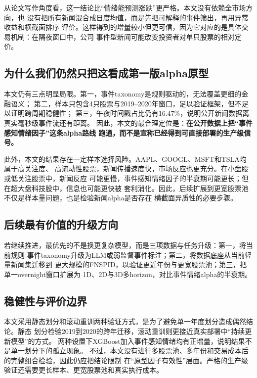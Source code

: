 \documentclass[UTF8,a4paper,10pt,twocolumn,fontset=none]{ctexart}
\begin{document}
从论文写作角度看，这一结论比“情绪能预测涨跌”更严格。本文没有依赖全市场方向，也
没有把所有新闻混合成日度均值，而是先把可解释的事件筛出，再用异常收益和横截面排序
评价。这样得到的增量较小但更可信，因为它对应的是具体交易机制：在隔夜窗口中，公司
事件型新闻可能改变投资者对单只股票的相对定价。

\subsection{为什么我们仍然只把这看成第一版alpha原型}

本文仍有三点明显局限。第一，事件taxonomy是规则驱动的，无法覆盖更细的金融语义；
第二，样本只包含4只股票与2019--2020年窗口，足以验证框架，但不足以证明跨周期稳健性；
第三，午夜时间戳占比仍有16.47\%，说明公开新闻数据离真实毫秒级事件流还有距离。
因此，本文的最合理定位是：\textbf{在公开数据上把“事件感知情绪因子”这条alpha路线
跑通，而不是宣称已经得到可直接部署的生产级信号。}

此外，本文的结果存在一定样本选择风险。AAPL、GOOGL、MSFT和TSLA均属于高关注度、
高流动性股票，新闻传播速度快，市场反应也更充分。在小盘股或低关注股票中，新闻反应
可能更慢，事件感知情绪因子的半衰期可能更长；但在超大盘科技股中，信息也可能更快被
套利消化。因此，后续扩展到更宽股票池不仅是样本量问题，也是检验新闻alpha是否存在
横截面异质性的必要步骤。

\subsection{后续最有价值的升级方向}

若继续推进，最优先的不是换更复杂模型，而是三项数据与任务升级：第一，将当前规则
事件taxonomy升级为LLM或弱监督事件标注；第二，将数据底座从当前轻量新闻集迁移到
更大规模的FNSPID，以验证更近年份与更宽股票池；第三，把单一overnight窗口扩展为
1D、2D与3D多horizon，对比事件情绪alpha的半衰期。

\subsection{稳健性与评价边界}

本文采用静态划分和滚动重训两种验证方式，是为了避免单一年度划分造成偶然结论。静态
划分检验2019到2020的跨年迁移，滚动重训则更接近真实部署中“持续更新模型”的方式。
两种设置下XGBoost加入事件感知情绪均有正增量，说明结果不是单一划分下的孤立现象。
不过，本文没有进行多股票池、多年份和交易成本后的完整组合检验，因此仍应把结论限制
在“原型因子有效性”层面。严格的生产级验证还需要更长样本、更宽股票池和真实执行成本。
\end{document}
